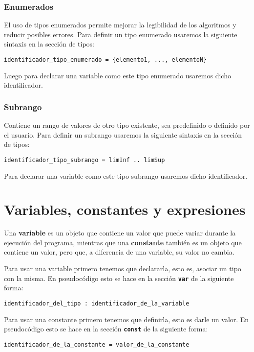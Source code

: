 \documentclass{article}
\newcommand{\pkeyword}[1]{\textcolor{azulpseudo}{\texttt{\textbf{#1}}}}
\begin{document}
\subsubsection{Enumerados}
El uso de tipos enumerados permite mejorar la legibilidad de los algoritmos y reducir posibles errores. Para definir un tipo enumerado usaremos la siguiente sintaxis en la sección de tipos:
\begin{lstlisting}[language = pseudocodigoesp]
identificador_tipo_enumerado = {elemento1, ..., elementoN}
\end{lstlisting}

Luego para declarar una variable como este tipo enumerado usaremos dicho identificador.

\subsubsection{Subrango}
Contiene un rango de valores de otro tipo existente, sea predefinido o definido por el usuario. Para definir un subrango usaremos la siguiente sintaxis en la sección de tipos:
\begin{lstlisting}[language = pseudocodigoesp]
identificador_tipo_subrango = limInf .. limSup
\end{lstlisting}

Para declarar una variable como este tipo subrango usaremos dicho identificador.
\section{Variables, constantes y expresiones}
Una \textbf{variable} es un objeto que contiene un valor que puede variar durante la ejecución del programa, mientras que una \textbf{constante} también es un objeto que contiene un valor, pero que, a diferencia de una variable, su valor no cambia.

Para usar una variable primero tenemos que declararla, esto es, asociar un tipo con la misma. En pseudocódigo esto se hace en la sección \pkeyword{var} de la siguiente forma:
\begin{lstlisting}[language = pseudocodigoesp]
identificador_del_tipo : identificador_de_la_variable
\end{lstlisting}

Para usar una constante primero tenemos que definirla, esto es darle un valor. En pseudocódigo esto se hace en la sección \pkeyword{const} de la siguiente forma:
\begin{lstlisting}[language = pseudocodigoesp]
identificador_de_la_constante = valor_de_la_constante
\end{lstlisting}
\end{document}
